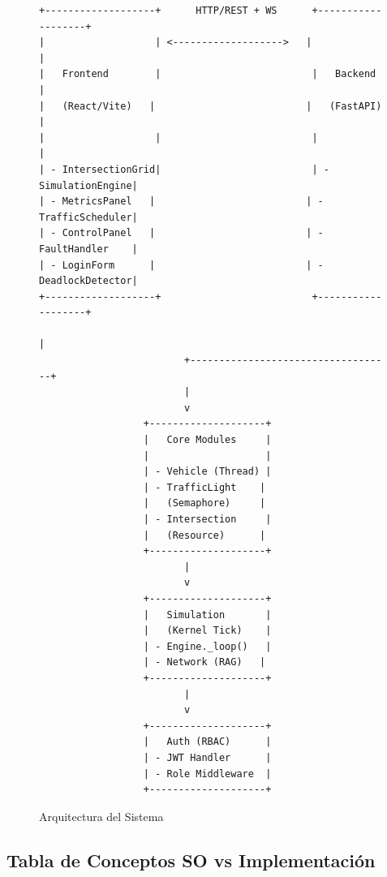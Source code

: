 \documentclass[12pt,a4paper]{article}
\begin{document}
\begin{figure}[htbp]
\centering
\begin{verbatim}
+-------------------+      HTTP/REST + WS      +-------------------+
|                   | <------------------->   |                   |
|   Frontend        |                          |   Backend         |
|   (React/Vite)   |                          |   (FastAPI)       |
|                   |                          |                   |
| - IntersectionGrid|                          | - SimulationEngine|
| - MetricsPanel   |                          | - TrafficScheduler|
| - ControlPanel   |                          | - FaultHandler    |
| - LoginForm      |                          | - DeadlockDetector|
+-------------------+                          +-------------------+
                                                            |
                         +-----------------------------------+
                         |
                         v
                  +--------------------+
                  |   Core Modules     |
                  |                    |
                  | - Vehicle (Thread) |
                  | - TrafficLight    |
                  |   (Semaphore)     |
                  | - Intersection     |
                  |   (Resource)      |
                  +--------------------+
                         |
                         v
                  +--------------------+
                  |   Simulation       |
                  |   (Kernel Tick)    |
                  | - Engine._loop()   |
                  | - Network (RAG)   |
                  +--------------------+
                         |
                         v
                  +--------------------+
                  |   Auth (RBAC)      |
                  | - JWT Handler      |
                  | - Role Middleware  |
                  +--------------------+
\end{verbatim}
\caption{Arquitectura del Sistema}
\end{figure}

\subsection{Tabla de Conceptos SO vs Implementación}
\end{document}
